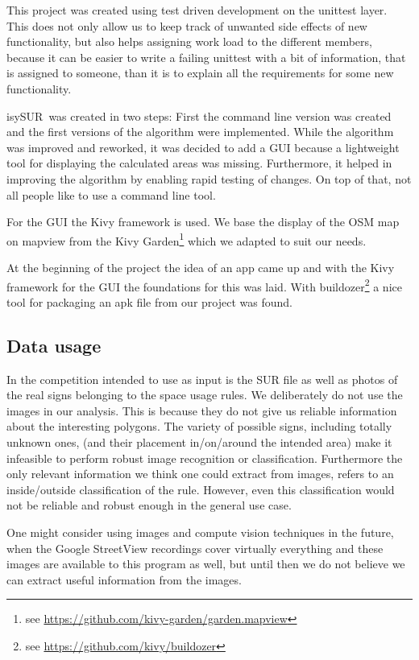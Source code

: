 \documentclass[11pt,fleqn]{book} %
\newcommand{\ProjectTitle}{isySUR}
\newcommand{\pt}{\ProjectTitle}
\begin{document}
This project was created using test driven development on the unittest layer. This does not only allow us to keep track of unwanted side effects of new functionality, but also helps assigning work load to the different members, because it can be easier to write a failing unittest with a bit of information, that is assigned to someone, than it is to explain all the requirements for some new functionality.

\pt\ was created in two steps: First the command line version was created and the first versions of the algorithm were implemented. While the algorithm was improved and reworked, it was decided to add a GUI because a lightweight tool for displaying the calculated areas was missing. Furthermore, it helped in improving the algorithm by enabling rapid testing of changes. On top of that, not all people like to use a command line tool.

For the GUI the Kivy framework is used. We base the display of the OSM map on mapview from the Kivy Garden\footnote{see \url{https://github.com/kivy-garden/garden.mapview}} which we adapted to suit our needs.

At the beginning of the project the idea of an app came up and with the Kivy framework for the GUI the foundations for this was laid. With buildozer\footnote{see \url{https://github.com/kivy/buildozer}} a nice tool for packaging an apk file from our project was found.

\subsection{Data usage}\label{sec:data_usage}
In the competition intended to use as input is the SUR file as well as photos of the real signs belonging to the space usage rules. We deliberately do not use the images in our analysis. This is because they do not give us reliable information about the interesting polygons. The variety of possible signs, including totally unknown ones, (and their placement in/on/around the intended area) make it infeasible to perform robust image recognition or classification. Furthermore the only relevant information we think one could extract from images, refers to an inside/outside classification of the rule. However, even this classification would not be reliable and robust enough in the general use case.

One might consider using images and compute vision techniques in the future, when the Google StreetView recordings cover virtually everything and these images are available to this program as well, but until then we do not believe we can extract useful information from the images.
\end{document}

